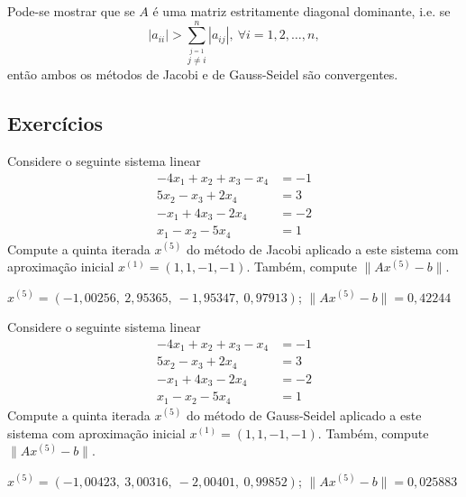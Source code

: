 \begin{obs}{}
  Pode-se mostrar que se $A$ é uma matriz estritamente diagonal dominante, i.e. se
  \begin{equation}
    |a_{ii}| > \sum_{\overset{j=1}{j\neq i}}^n |a_{ij}|,~\forall i=1, 2, \ldots, n,
  \end{equation}
então ambos os métodos de Jacobi e de Gauss-Seidel são convergentes.
\end{obs}

\subsection*{Exercícios}

\begin{exer}\label{exer:jacobi_exec}
  Considere o seguinte sistema linear
  \begin{align}
    -4x_1 + x_2 + x_3 - x_4 &= -1\\
    5x_2 -x_3 + 2x_4 &= 3\\
    -x_1 + 4x_3 - 2x_4 &= -2\\
    x_1 -x_2 -5x_4 &= 1
  \end{align}
  Compute a quinta iterada $x^{(5)}$ do método de Jacobi aplicado a este sistema com aproximação inicial $x^{(1)} = (1, 1, -1, -1)$. Também, compute $\|Ax^{(5)} - b\|$.
\end{exer}
\begin{resp}
  $x^{(5)} = (-1,00256,~2,95365,~-1,95347,~0,97913)$; $\|Ax^{(5)}-b\| = 0,42244$
\end{resp}

\begin{exer}\label{exer:gs_exec}
  Considere o seguinte sistema linear
  \begin{align}
    -4x_1 + x_2 + x_3 - x_4 &= -1\\
    5x_2 -x_3 + 2x_4 &= 3\\
    -x_1 + 4x_3 - 2x_4 &= -2\\
    x_1 -x_2 -5x_4 &= 1
  \end{align}
  Compute a quinta iterada $x^{(5)}$ do método de Gauss-Seidel aplicado a este sistema com aproximação inicial $x^{(1)} = (1, 1, -1, -1)$. Também, compute $\|Ax^{(5)} - b\|$.
\end{exer}
\begin{resp}
  $x^{(5)} = (-1,00423,~3,00316,~-2,00401,~0,99852)$; $\|Ax^{(5)}-b\| = 0,025883$
\end{resp}

